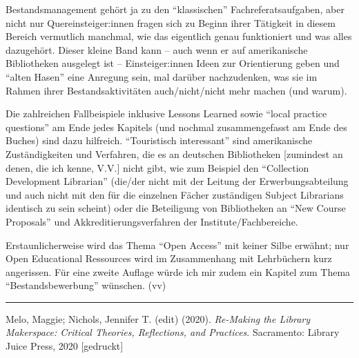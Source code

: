 \documentclass[a4paper,
fontsize=11pt,
oneside,
numbers=noperiodatend,
parskip=half-,
bibliography=totoc,
final
]{scrartcl}
\begin{document}
Bestandsmanagement gehört ja zu den \enquote{klassischen}
Fachreferatsaufgaben, aber nicht nur Quereinsteiger:innen fragen sich zu
Beginn ihrer Tätigkeit in diesem Bereich vermutlich manchmal, wie das
eigentlich genau funktioniert und was alles dazugehört. Dieser kleine
Band kann -- auch wenn er auf amerikanische Bibliotheken ausgelegt ist
-- Einsteiger:innen Ideen zur Orientierung geben und \enquote{alten
Hasen} eine Anregung sein, mal darüber nachzudenken, was sie im Rahmen
ihrer Bestandsaktivitäten auch/nicht/nicht mehr machen (und warum).

Die zahlreichen Fallbeispiele inklusive Lessons Learned sowie
\enquote{local practice questions} am Ende jedes Kapitels (und nochmal
zusammengefasst am Ende des Buches) sind dazu hilfreich.
\enquote{Touristisch interessant} sind amerikanische Zuständigkeiten und
Verfahren, die es an deutschen Bibliotheken {[}zumindest an denen, die
ich kenne, V.V.{]} nicht gibt, wie zum Beispiel den \enquote{Collection
Development Librarian} (die/der nicht mit der Leitung der
Erwerbungsabteilung und auch nicht mit den für die einzelnen Fächer
zuständigen Subject Librarians identisch zu sein scheint) oder die
Beteiligung von Bibliotheken an \enquote{New Course Proposals} und
Akkreditierungsverfahren der Institute/Fachbereiche.

Erstaunlicherweise wird das Thema \enquote{Open Access} mit keiner Silbe
erwähnt; nur Open Educational Ressources wird im Zusammenhang mit
Lehrbüchern kurz angerissen. Für eine zweite Auflage würde ich mir zudem
ein Kapitel zum Thema \enquote{Bestandsbewerbung} wünschen. (vv)

\begin{center}\rule{0.5\linewidth}{0.5pt}\end{center}

Melo, Maggie; Nichols, Jennifer T. (edit) (2020). \emph{Re-Making the
Library Makerspace: Critical Theories, Reflections, and Practices}.
Sacramento: Library Juice Press, 2020 {[}gedruckt{]}
\end{document}
